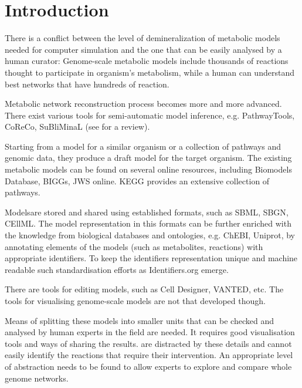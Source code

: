 \documentclass{bioinfo}
\begin{document}
\section{Introduction}

There is a conflict between the level of demineralization of metabolic models needed for computer simulation and the one that can be easily analysed by a human curator: Genome-scale metabolic models include thousands of reactions thought to participate in organism's metabolism, while a human can understand best networks that have hundreds of reaction.

Metabolic network reconstruction process becomes more and more advanced. There exist various tools for semi-automatic model inference, e.g. PathwayTools\cite{Karp2002}, CoReCo\cite{Pitkanen2014}, SuBliMinaL\cite{Swainston2011} (see \cite{Hamilton2014} for a review).

Starting from a model for a similar organism or a collection of pathways and genomic data, they produce a draft model for the target organism. The existing metabolic models can be found on several online resources, including Biomodels Database\cite{Li10}, BIGGs\cite{Schellenberger2010}, JWS online\cite{Snoep2003}. KEGG\cite{Kanehisa12} provides an extensive collection of pathways. 

Modelsare stored and shared using established formats, such as SBML\cite{Hucka2003}, SBGN\cite{Moodie2011}, CEllML\cite{Lloyd2004}. The model representation in this formats can be further enriched with the knowledge from biological databases and ontologies, e.g. ChEBI\cite{deMatos10}, Uniprot\cite{TheUniProtConsortium2013}, by annotating elements of the models (such as metabolites, reactions) with appropriate identifiers. To keep the identifiers representation unique and machine readable such standardisation efforts as Identifiers.org\cite{Juty2012} emerge.



There are tools  for editing models, such as Cell Designer, VANTED, etc. The tools for visualising genome-scale models are not that developed though. 


Means of splitting these models into smaller units that can be checked and analysed by human experts in the field are needed. It requires good visualisation tools and ways of sharing the results. are distracted by these details and cannot easily identify the reactions that require their intervention. An appropriate level of abstraction needs to be found to allow experts to explore and compare whole genome networks. 
\end{document}
